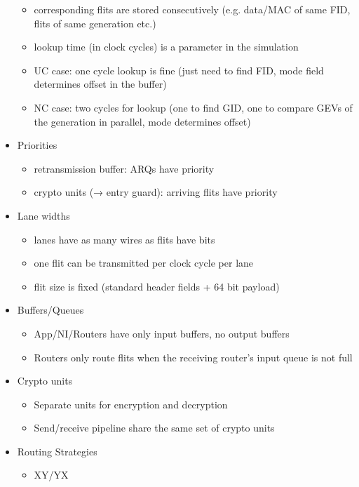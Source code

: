 \begin{itemize}
\begin{itemize}
            \item corresponding flits are stored consecutively (e.g. data/MAC of same FID, flits of same generation etc.)
            \item lookup time (in clock cycles) is a parameter in the simulation
            \item UC case: one cycle lookup is fine (just need to find FID, mode field determines offset in the buffer)
            \item NC case: two cycles for lookup (one to find GID, one to compare GEVs of the generation in parallel, mode determines offset)
        \end{itemize}
    \item Priorities
        \begin{itemize}
            \item retransmission buffer: ARQs have priority
            \item crypto units (→ entry guard): arriving flits have priority
        \end{itemize}
    \item Lane widths
        \begin{itemize}
            \item lanes have as many wires as flits have bits
            \item one flit can be transmitted per clock cycle per lane
            \item flit size is fixed (standard header fields + 64 bit payload)
        \end{itemize}
    \item Buffers/Queues
        \begin{itemize}
            \item App/NI/Routers have only input buffers, no output buffers
            \item Routers only route flits when the receiving router's input queue is not full
        \end{itemize}
    \item Crypto units
        \begin{itemize}
            \item Separate units for encryption and decryption
            \item Send/receive pipeline share the same set of crypto units
        \end{itemize}
    \item Routing Strategies
        \begin{itemize}
            \item XY/YX

\end{itemize}
\end{itemize}
